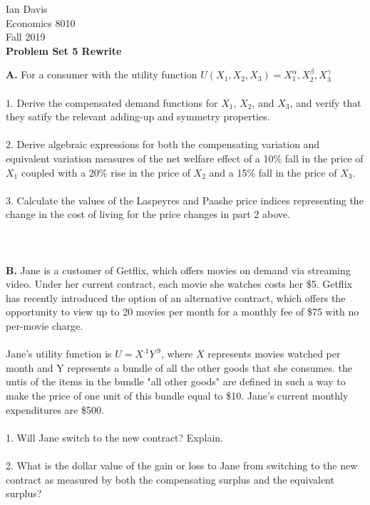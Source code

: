 \documentclass[11pt]{article}
\begin{document}
\begin{flushleft}
Ian Davis\\
Economics 8010\\
Fall 2019\\
\bigskip
\textbf{Problem Set 5 Rewrite}\\
\end{flushleft}
\textbf{A. } For a consumer with the utility function $U(X_1,X_2,X_3) = X_1^\alpha ,X_2^\beta , X_3^\gamma$\\
\\
1. Derive the compensated demand functions for $X_1$, $X_2$, and $X_3$, and verify that they satify the relevant adding-up and symmetry properties.\\
\\
2. Derive algebraic expressions for both the compensating variation and equivalent variation measures of the net welfare effect of a 10\% fall in the price of $X_1$ coupled with a 20\% rise in the price of $X_2$ and a 15\% fall in the price of $X_3$.\\
\\
3. Calculate the values of the Laspeyres and Paashe price indices representing the change in the cost of living for the price changes in part 2 above.\\
\\
\\
\\
\textbf{B. }Jane is a customer of Getflix, which offers movies on demand via streaming video. Under her current contract, each movie she watches costs her \$5. Getflix has recently introduced the option of an alternative contract, which offers the opportunity to view up to 20 movies per month for a monthly fee of \$75 with no per-movie charge.\\
\\
Jane's utility function is $U = X^.1Y^.9$, where $X$ represents movies watched per month and Y represents a bundle of all the other goods that she consumes. the untis of the items in the bundle "all other goods" are defined in such a way to make the price of one unit of this bundle equal to \$10. Jane's current monthly expenditures are \$500.\\
\\
1. Will Jane switch to the new contract? Explain.\\
\\
2. What is the dollar value of the gain or loss to Jane from switching to the new contract as measured by both the compensating surplus and the equivalent surplus?\\
\end{document}
